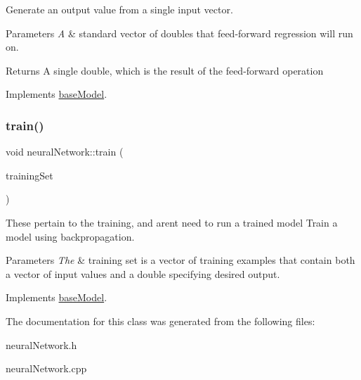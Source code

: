 Generate an output value from a single input vector. 
\begin{DoxyParams}{Parameters}
{\em A} & standard vector of doubles that feed-\/forward regression will run on. \\
\hline
\end{DoxyParams}
\begin{DoxyReturn}{Returns}
A single double, which is the result of the feed-\/forward operation 
\end{DoxyReturn}


Implements \hyperlink{classbase_model}{base\+Model}.

\mbox{\label{classneural_network_aae35def98392b0d0a51f2c82afc48efc}} 
\subsubsection{\texorpdfstring{train()}{train()}}
{\footnotesize\ttfamily void neural\+Network\+::train (\begin{DoxyParamCaption}\item[{std\+::vector$<$ \hyperlink{structtraining_example}{training\+Example} $>$}]{training\+Set }\end{DoxyParamCaption})\hspace{0.3cm}{\ttfamily [virtual]}}

These pertain to the training, and aren\textquotesingle{}t need to run a trained model Train a model using backpropagation.


\begin{DoxyParams}{Parameters}
{\em The} & training set is a vector of training examples that contain both a vector of input values and a double specifying desired output. \\
\hline
\end{DoxyParams}


Implements \hyperlink{classbase_model}{base\+Model}.



The documentation for this class was generated from the following files\+:\begin{DoxyCompactItemize}
\item 
neural\+Network.\+h\item 
neural\+Network.\+cpp\end{DoxyCompactItemize}
